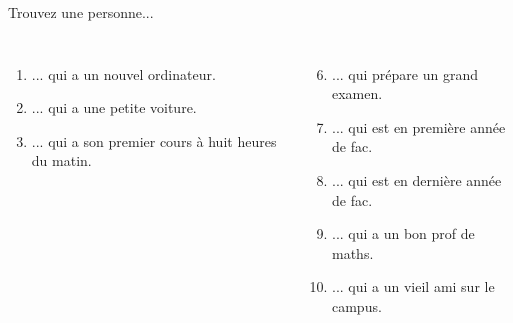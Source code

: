 \begin{frame}[b]{Trouvez une personne...}
{\begin{columns}[t]
\begin{enumerate}
        \item ... qui a un nouvel ordinateur.
        \item ... qui a une petite voiture.
        \item ... qui a son premier cours à huit heures du matin.
      \end{enumerate}
      \begin{enumerate}
        \setcounter{enumi}{5}
        \item ... qui prépare un grand examen.
        \item ... qui est en première année de fac.
        \item ... qui est en dernière année de fac.
        \item ... qui a un bon prof de maths.
        \item ... qui a un vieil ami sur le campus.
      \end{enumerate}
  \end{columns}
  }
\end{frame}